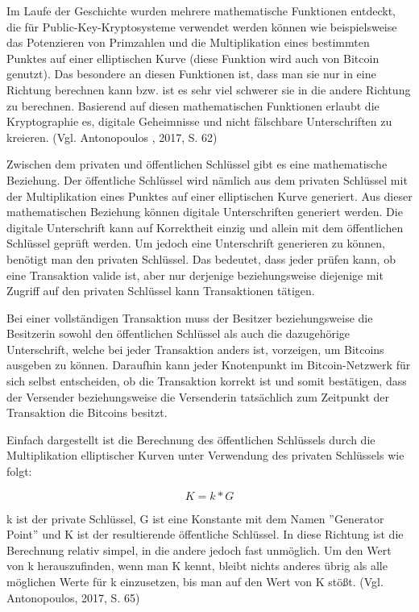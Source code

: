 Im Laufe der Geschichte wurden mehrere mathematische Funktionen entdeckt, die für Public-Key-Kryptosysteme verwendet werden können
wie beispielsweise das Potenzieren von Primzahlen und die Multiplikation eines bestimmten Punktes auf einer elliptischen Kurve
(diese Funktion wird auch von Bitcoin genutzt). Das besondere an diesen Funktionen ist, dass man sie nur in eine Richtung
berechnen kann bzw. ist es sehr viel schwerer sie in die andere Richtung zu berechnen. Basierend auf diesen mathematischen
Funktionen erlaubt die Kryptographie es, digitale Geheimnisse und nicht fälschbare Unterschriften zu kreieren. (Vgl. Antonopoulos
, 2017, S. 62)

Zwischen dem privaten und öffentlichen Schlüssel gibt es eine mathematische Beziehung. Der öffentliche Schlüssel wird nämlich
aus dem privaten Schlüssel mit der Multiplikation eines Punktes auf einer elliptischen Kurve generiert. Aus dieser mathematischen
Beziehung können digitale Unterschriften generiert werden. Die digitale Unterschrift kann auf Korrektheit einzig und allein mit
dem öffentlichen Schlüssel geprüft werden. Um jedoch eine Unterschrift generieren zu können, benötigt man den privaten Schlüssel.
Das bedeutet, dass jeder prüfen kann, ob eine Transaktion valide ist, aber nur derjenige beziehungsweise diejenige mit Zugriff auf den 
privaten Schlüssel kann Transaktionen tätigen.

Bei einer vollständigen Transaktion muss der Besitzer beziehungsweise die Besitzerin sowohl den öffentlichen Schlüssel als auch die
dazugehörige Unterschrift, welche bei jeder Transaktion anders ist, vorzeigen, um Bitcoins ausgeben zu können. Daraufhin kann 
jeder Knotenpunkt im Bitcoin-Netzwerk für sich selbst entscheiden, ob die Transaktion korrekt ist und somit bestätigen, dass 
der Versender beziehungsweise die Versenderin tatsächlich zum Zeitpunkt der Transaktion die Bitcoins besitzt.

Einfach dargestellt ist die Berechnung des öffentlichen Schlüssels durch die Multiplikation elliptischer Kurven unter Verwendung
des privaten Schlüssels wie folgt:

\[ K = k * G \]

k ist der private Schlüssel, G ist eine Konstante mit dem Namen ''Generator Point'' und K ist der resultierende öffentliche Schlüssel.
In diese Richtung ist die Berechnung relativ simpel, in die andere jedoch fast unmöglich. Um den Wert von k herauszufinden, wenn
man K kennt, bleibt nichts anderes übrig als alle möglichen Werte für k einzusetzen, bis man auf den Wert von K stößt. (Vgl. 
Antonopoulos, 2017, S. 65)

